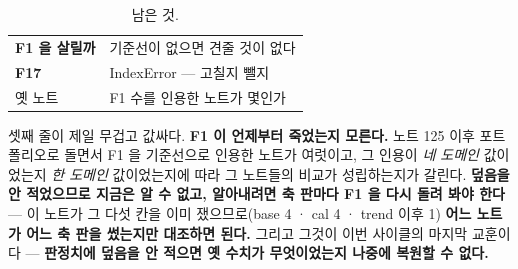 \documentclass[10pt]{article}
\begin{document}

\begin{table}[t]
\centering\tsize
\caption{남은 것.}
\begin{tabular}{ll}
\toprule
\textbf{F1 을 살릴까} & 기준선이 없으면 견줄 것이 없다 \\
\textbf{F17} & IndexError --- 고칠지 뺄지 \\
옛 노트 & F1 수를 인용한 노트가 몇인가 \\
\bottomrule
\end{tabular}
\end{table}

셋째 줄이 제일 무겁고 값싸다. \textbf{F1 이 언제부터 죽었는지 모른다.}
노트 125 이후 포트폴리오로 돌면서 F1 을 기준선으로 인용한 노트가 여럿이고,
그 인용이 \emph{네 도메인} 값이었는지 \emph{한 도메인} 값이었는지에 따라
그 노트들의 비교가 성립하는지가 갈린다. \textbf{덮음을 안 적었으므로
지금은 알 수 없고, 알아내려면 축 판마다 F1 을 다시 돌려 봐야 한다} ---
이 노트가 그 다섯 칸을 이미 쟀으므로(base 4 · cal 4 · trend 이후 1)
\textbf{어느 노트가 어느 축 판을 썼는지만 대조하면 된다.} 그리고 그것이
이번 사이클의 마지막 교훈이다 --- \textbf{판정치에 덮음을 안 적으면 옛
수치가 무엇이었는지 나중에 복원할 수 없다.}
\end{document}
